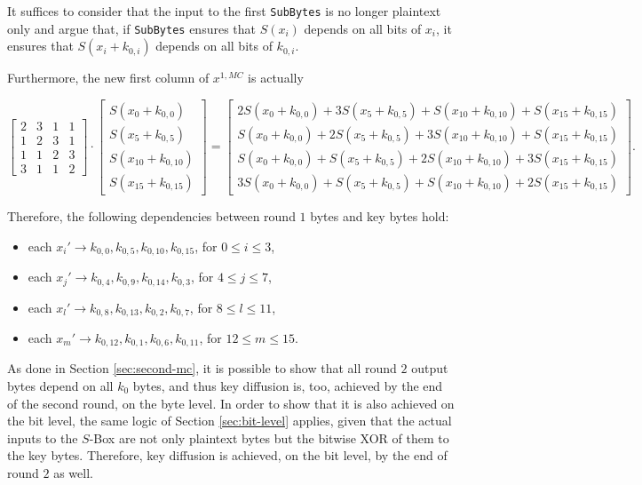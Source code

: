 \documentclass{report}
\begin{document}
It suffices to consider that the input to the first \texttt{SubBytes} is no longer plaintext only and argue that, if \texttt{SubBytes} ensures that $S(x_i)$ depends on all bits of $x_i$, it ensures that $S(x_i + k_{0,i})$ depends on all bits of $k_{0,i}$.

Furthermore, the new first column of $x^{1, MC}$ is actually

\begin{equation}
\begin{bmatrix}
2 & 3 & 1 & 1\\
1 & 2 & 3 & 1\\
1 & 1 & 2 & 3\\
3 & 1 & 1 & 2
\end{bmatrix} \cdot
\begin{bmatrix}
S(x_0 + k_{0,0}) \\
S(x_5 + k_{0,5}) \\
S(x_{10}+ k_{0,10}) \\
S(x_{15} + k_{0,15}) 
\end{bmatrix} =
\begin{bmatrix}
2S(x_0 + k_{0,0}) + 3S(x_5 + k_{0,5}) + S(x_{10} + k_{0,10}) + S(x_{15} + k_{0,15})\\
S(x_0 + k_{0,0}) + 2S(x_5 + k_{0,5}) + 3S(x_{10} + k_{0,10}) + S(x_{15} + k_{0,15})\\
S(x_0 + k_{0,0}) + S(x_5 + k_{0,5}) + 2S(x_{10} + k_{0,10}) + 3S(x_{15} + k_{0,15})\\
3S(x_0 + k_{0,0}) + S(x_5 + k_{0,5}) + S(x_{10} + k_{0,10}) + 2S(x_{15} + k_{0,15})
\end{bmatrix}. 
\end{equation}

Therefore, the following dependencies between round $1$ bytes and key bytes hold:

\begin{itemize}
    \item each $x_i'\rightarrow k_{0,0}, k_{0,5}, k_{0,10}, k_{0,15}$, for $0 \leq i \leq 3$,
    \item each $x_j'\rightarrow k_{0,4}, k_{0,9}, k_{0,14}, k_{0,3}$, for $4 \leq j \leq 7$,
    \item each $x_l'\rightarrow k_{0,8}, k_{0,13}, k_{0,2}, k_{0,7}$, for $8 \leq l \leq 11$,
    \item each $x_m'\rightarrow k_{0,12}, k_{0,1}, k_{0,6}, k_{0,11}$, for $12 \leq m \leq 15$.
\end{itemize}

As done in Section \ref{sec:second-mc}, it is possible to show that all round $2$ output bytes depend on all $k_0$ bytes, and thus key diffusion is, too, achieved by the end of the second round, on the byte level. In order to show that it is also achieved on the bit level, the same logic of Section \ref{sec:bit-level} applies, given that the actual inputs to the $S$-Box are not only plaintext bytes but the bitwise XOR of them to the key bytes. Therefore, key diffusion is achieved, on the bit level, by the end of round $2$ as well.
\end{document}
